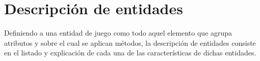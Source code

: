\section{Descripción de entidades}

Definiendo a una entidad de juego como todo aquel elemento que agrupa atributos
y sobre el cual se aplican métodos, la descripción de entidades consiste en el
listado y explicación de cada una de las características de dichas entidades.










